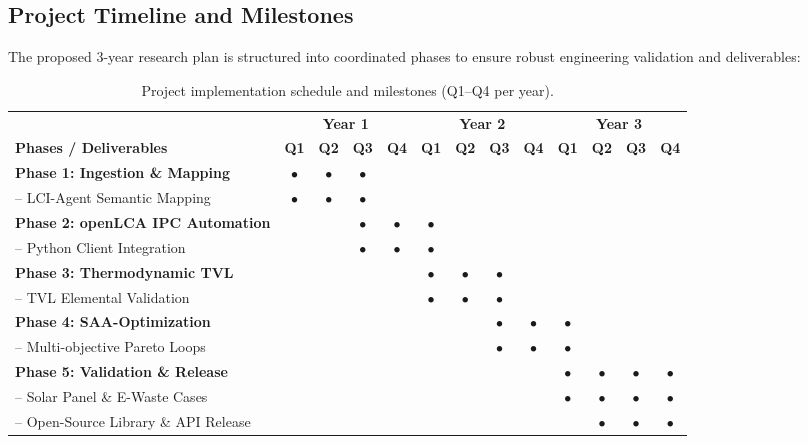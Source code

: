 \documentclass[11pt]{article}
\begin{document}
\subsection{Project Timeline and Milestones}
The proposed 3-year research plan is structured into coordinated phases to ensure robust engineering validation and deliverables:
\begin{table}[htbp]
    \centering
    \small
    \begin{tabular}{lcccccccccccc}
        \toprule
        & \multicolumn{4}{c}{\textbf{Year 1}} & \multicolumn{4}{c}{\textbf{Year 2}} & \multicolumn{4}{c}{\textbf{Year 3}} \\
        \cmidrule(lr){2-5} \cmidrule(lr){6-9} \cmidrule(lr){10-13}
        \textbf{Phases / Deliverables} & \textbf{Q1} & \textbf{Q2} & \textbf{Q3} & \textbf{Q4} & \textbf{Q1} & \textbf{Q2} & \textbf{Q3} & \textbf{Q4} & \textbf{Q1} & \textbf{Q2} & \textbf{Q3} & \textbf{Q4} \\
        \midrule
        \textbf{Phase 1: Ingestion \& Mapping} & $\bullet$ & $\bullet$ & $\bullet$ & & & & & & & & & \\
        -- LCI-Agent Semantic Mapping & $\bullet$ & $\bullet$ & $\bullet$ & & & & & & & & & \\
        \textbf{Phase 2: openLCA IPC Automation} & & & $\bullet$ & $\bullet$ & $\bullet$ & & & & & & & \\
        -- Python Client Integration & & & $\bullet$ & $\bullet$ & $\bullet$ & & & & & & & \\
        \textbf{Phase 3: Thermodynamic TVL} & & & & & $\bullet$ & $\bullet$ & $\bullet$ & & & & & \\
        -- TVL Elemental Validation & & & & & $\bullet$ & $\bullet$ & $\bullet$ & & & & & \\
        \textbf{Phase 4: SAA-Optimization} & & & & & & & $\bullet$ & $\bullet$ & $\bullet$ & & & \\
        -- Multi-objective Pareto Loops & & & & & & & $\bullet$ & $\bullet$ & $\bullet$ & & & \\
        \textbf{Phase 5: Validation \& Release} & & & & & & & & & $\bullet$ & $\bullet$ & $\bullet$ & $\bullet$ \\
        -- Solar Panel \& E-Waste Cases & & & & & & & & & $\bullet$ & $\bullet$ & $\bullet$ & $\bullet$ \\
        -- Open-Source Library \& API Release & & & & & & & & & & $\bullet$ & $\bullet$ & $\bullet$ \\
        \bottomrule
    \end{tabular}
    \caption{Project implementation schedule and milestones (Q1--Q4 per year).}
    \label{tab:timeline}
\end{table}
\end{document}
